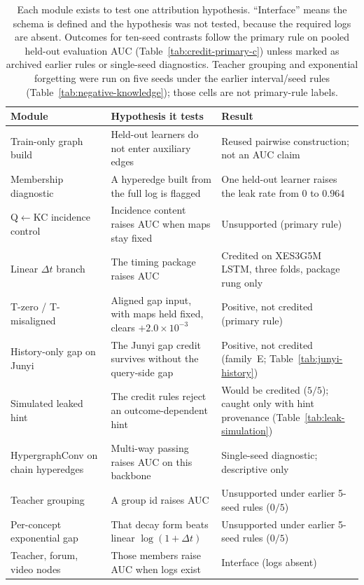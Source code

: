 \begin{table}[tbp]
\caption{Each module exists to test one attribution hypothesis.
``Interface'' means the schema is defined and the hypothesis was not
tested, because the required logs are absent. Outcomes for ten-seed
contrasts follow the primary rule on pooled held-out evaluation AUC
(Table~\ref{tab:credit-primary-c}) unless marked as archived earlier
rules or single-seed diagnostics. Teacher grouping and exponential
forgetting were run on five seeds under the earlier interval/seed rules
(Table~\ref{tab:negative-knowledge}); those cells are not primary-rule
labels.}
\label{tab:module-hypothesis}
\centering
\scriptsize
\begin{tabularx}{\textwidth}{@{}>{\raggedright\arraybackslash}p{3.4cm}
>{\raggedright\arraybackslash}X
>{\raggedright\arraybackslash}p{3.6cm}@{}}
\toprule
Module & Hypothesis it tests & Result \\
\midrule
Train-only graph build & Held-out learners do not enter auxiliary edges &
Reused pairwise construction; not an AUC claim \\
Membership diagnostic & A hyperedge built from the full log is flagged &
One held-out learner raises the leak rate from $0$ to $0.964$ \\
Q$\leftarrow$KC incidence control & Incidence content raises AUC when maps stay fixed &
Unsupported (primary rule) \\
Linear $\Delta t$ branch & The timing package raises AUC &
Credited on XES3G5M LSTM, three folds, package rung only \\
T-zero / T-misaligned & Aligned gap input, with maps held fixed, clears $+2.0\times 10^{-3}$ &
Positive, not credited (primary rule) \\
History-only gap on Junyi & The Junyi gap credit survives without the
query-side gap & Positive, not credited (family~E;
Table~\ref{tab:junyi-history}) \\
Simulated leaked hint & The credit rules reject an outcome-dependent hint &
Would be credited ($5/5$); caught only with hint provenance
(Table~\ref{tab:leak-simulation}) \\
HypergraphConv on chain hyperedges & Multi-way passing raises AUC on this backbone &
Single-seed diagnostic; descriptive only \\
Teacher grouping & A group id raises AUC &
Unsupported under earlier 5-seed rules ($0/5$) \\
Per-concept exponential gap & That decay form beats linear $\log(1{+}\Delta t)$ &
Unsupported under earlier 5-seed rules ($0/5$) \\
Teacher, forum, video nodes & Those members raise AUC when logs exist &
Interface (logs absent) \\
\bottomrule
\end{tabularx}
\end{table}
